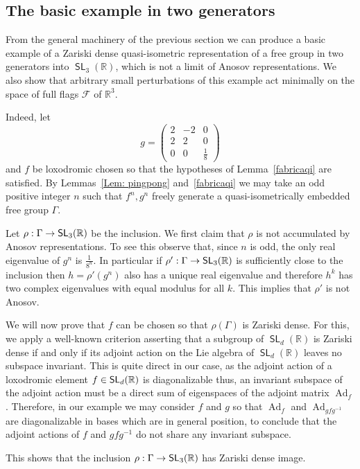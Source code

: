 \documentclass[AHL,Unicode,longabstracts]{cedram}
\DeclareMathOperator{\SL}{\mathsf{SL}}
\DeclareMathOperator{\Ad}{Ad}
\newcommand{\F}{\mathcal{F}}
\newcommand{\R}{\mathbb{R}}
\newcommand{\RR}{\R}
\renewcommand*{\to}{\mathchoice{\longrightarrow}{\rightarrow}{\rightarrow}{\rightarrow}}
\let\oldin\in
\renewcommand{\in}{\mathchoice{\oldin}{\oldin}{\,\oldin\,}{\,\oldin\,}}
\newcommand{\RR}{\mathbb{R}}
\begin{document}
\subsection{The basic example in two generators}\label{ss.minimal}

From the general machinery of the previous section we can produce a basic example of a Zariski dense quasi-isometric representation of a free group in two generators into $\SL_3(\R)$, which is not a limit of Anosov representations. We also show that arbitrary small perturbations of this example act minimally on the space of full flags $\F$ of $\R^3$.

Indeed, let
\[
g =
\begin{pmatrix}2 & -2 & 0\\ 2 & 2 & 0\\ 0 & 0 & \frac{1}{8}
\end{pmatrix}
\]
and $f$ be loxodromic chosen so that the hypotheses of Lemma~\ref{fabricaqi} are satisfied.
By Lemmas~\ref{Lem: pingpong} and~\ref{fabricaqi} we may take an odd positive integer $n$ such that $f^n, g^n$ freely generate a quasi-isometrically embedded free group $\Gamma$.

Let $\rho:\Gamma \to \SL_3(\R)$ be the inclusion. We first claim that $\rho$ is not accumulated by Anosov representations. To see this observe that, since $n$ is odd, the only real eigenvalue of $g^n$ is $\frac{1}{8^n}$. In particular if $\rho':\Gamma \to \SL_3(\R)$ is sufficiently close to the inclusion then $h = \rho'(g^n)$ also has a unique real eigenvalue and therefore $h^k$ has two complex eigenvalues with equal modulus for all $k$. This implies that $\rho'$ is not Anosov.

We will now prove that $f$ can be chosen so that $\rho(\Gamma)$ is Zariski dense. For this, we apply a well-known criterion asserting that a subgroup of $\SL_d(\RR)$ is Zariski dense if and only if its adjoint action on the Lie algebra of $\SL_d(\R)$ leaves no subspace invariant. This is quite direct in our case, as the adjoint action of a loxodromic element $f\in\SL_d(\R)$ is diagonalizable thus, an invariant subspace of the adjoint action must be a direct sum of eigenspaces of the adjoint matrix $\Ad_f$. Therefore, in our example we may consider $f$ and $g$ so that $\Ad_f$ and $\Ad_{gfg^{-1}}$ are diagonalizable in bases which are in general position, to conclude that the adjoint actions of $f$ and $gfg^{-1}$ do not share any invariant subspace.

This shows that the inclusion $\rho:\Gamma\to\SL_3(\R)$ has Zariski dense image.
\end{document}
